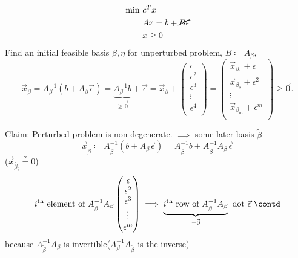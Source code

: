 \begin{align*}
	\min~ & c^Tx                              \\
	      & Ax = b + \cancel{B\vec{\epsilon}} \\
	      & x\geq 0
\end{align*}
Find an initial feasible basis \(\beta, \eta \) for unperturbed problem, \(B\coloneqq A_{\beta}\),
\[
	\vec{x}_{\beta}
	= A_{\beta}^{-1}(b + A_{\beta} \vec{\epsilon})
	= \underbrace{A^{-1}_{\beta}b}_{\geq \vec{0}} + \vec{\epsilon}
	= \vec{x}_{\beta} + \begin{pmatrix}
		\epsilon   \\
		\epsilon^2 \\
		\epsilon^3 \\
		\vdots     \\
		\epsilon^4 \\
	\end{pmatrix} = \begin{pmatrix}
		\vec{x}_{\beta_1} + \epsilon   \\
		\vec{x}_{\beta_2} + \epsilon^2 \\
		\vdots                         \\
		\vec{x}_{\beta_m} + \epsilon^m \\
	\end{pmatrix} \geq \vec{0}.
\]

Claim: Perturbed problem is non-degenerate. \(\implies\) some later basis \(\tilde{\beta}\)
\[
	\vec{x}_{\tilde{\beta}} \coloneqq A^{-1}_{\tilde{\beta}}(b + A_{\beta}\vec{\epsilon}) = A^{-1}_{\tilde{\beta}}b + A^{-1}_{\tilde{\beta}}A_{\beta}\vec{\epsilon}
\]
(\(\vec{x}_{\tilde{\beta_i}}\overset{?}{=}0\))
\[
	i^{\text{th}} \text{ element of }A^{-1}_{\tilde{\beta}}A_{\beta}\begin{pmatrix}
		\epsilon   \\
		\epsilon^2 \\
		\epsilon^3 \\
		\vdots     \\
		\epsilon^m \\
	\end{pmatrix} \implies \underbrace{i^{\text{th}} \text{ row of } A^{-1}_{\tilde{\beta}}A_{\beta}}_{=\vec{0}} \text{ dot }\vec{\epsilon}\ \contd
\]
because \(A^{-1}_{\tilde{\beta}}A_{\beta}\) is invertible(\(A^{-1}_{\beta}A_{\tilde{\beta}}\) is the inverse)